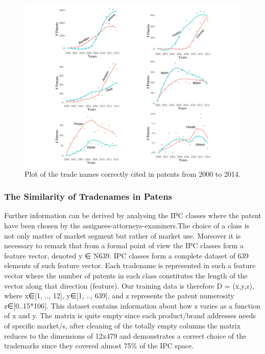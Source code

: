 \documentclass[]{book}
\theoremstyle{definition}
\theoremstyle{definition}
\theoremstyle{definition}
\theoremstyle{remark}
\begin{document}
\begin{figure}

{\centering \includegraphics[width=0.8\linewidth]{_bookdown_files/figures/Marks_Years} 

}

\caption{Plot of the trade names correctly cited in patents from 2000 to 2014.}\label{fig:populartm}
\end{figure}

\subsubsection*{The Similarity of Tradenames in
Patens}\label{the-similarity-of-tradenames-in-patens}

Further information can be derived by analysing the IPC classes where
the patent have been chosen by the assignees-attorneys-examiners.The
choice of a class is not only matter of market segment but rather of
market use. Moreover it is necessary to remark that from a formal point
of view the IPC classes form a feature vector, denoted y ∈ N639. IPC
classes form a complete dataset of 639 elements of such feature vector.
Each tradename is represented in such a feature vector where the number
of patents in each class constitutes the length of the vector along that
direction (feature). Our training data is therefore D = (x,y,z), where
x∈{[}1, .., 12{]}, y∈{[}1, .., 639{]}, and z represents the patent
numerosity z∈{[}0..15*106{]}. This dataset contains information about
how z varies as a function of x and y. The matrix is quite empty since
each product/brand addresses needs of specific market/s, after cleaning
of the totally empty columns the matrix reduces to the dimensions of
12x479 and demonstrates a correct choice of the trademarks since they
covered almost 75\% of the IPC space.
\end{document}
